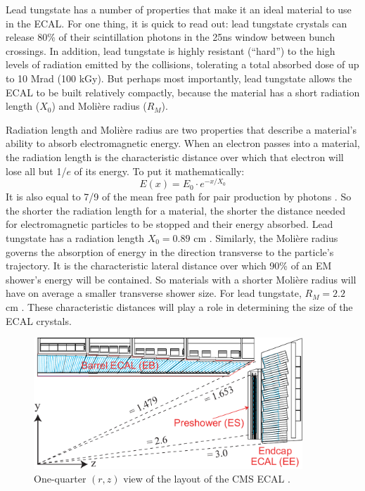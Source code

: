 Lead tungstate has a number of properties that make it an ideal
material to use in the ECAL. For one thing, it is quick to read
out: lead tungstate crystals can release 80\% of their scintillation
photons in the 25ns window between bunch crossings. In
addition, lead tungstate is highly resistant (``hard'') to the high
levels of radiation emitted by the collisions, tolerating a total
absorbed dose of up to 10 Mrad (100 kGy). But perhaps most importantly,
lead tungstate allows the ECAL to be built relatively compactly,
because the material has a short radiation length ($X_0$) and
Moli\`{e}re radius ($R_M$).

Radiation length and Moli\`{e}re radius are two properties that
describe a material's ability to absorb electromagnetic energy. When
an electron passes into a material, the radiation length is the
characteristic distance over which that electron will lose all
but 1/$e$ of its energy. To put it mathematically:
\begin{equation}
\label{eq:cms:ecal:radlength}
E(x) = E_0 \cdot e^{-x/X_0}
\end{equation}
It is also equal to 7/9 of the mean free path for pair production by
photons \cite{pdg}. So the shorter the radiation length for a
material, the shorter the distance needed for electromagnetic
particles to be stopped and their energy absorbed. Lead tungstate has
a radiation length $X_0 = 0.89$ cm \cite{tdr}. Similarly, the
Moli\`{e}re radius governs the absorption of energy in the direction
transverse to the particle's trajectory. It is the characteristic
lateral distance over which 90\% of an EM shower's energy will be
contained. So materials with a shorter Moli\`{e}re radius will have on
average a smaller transverse shower size. For lead tungstate, $R_M =
2.2$ cm \cite{tdr}. These characteristic distances will play a role in
determining the size of the ECAL crystals.

\begin{figure}[htb]
\centering
\includegraphics[width=0.9\textwidth]{figures/ecal-layout.pdf}
\caption[One-quarter $(r,z)$ view of the layout of the CMS ECAL.]{One-quarter $(r,z)$
  view of the layout of the CMS ECAL \cite{tdr}.}
\label{fig:cms:ecal}
\end{figure}

